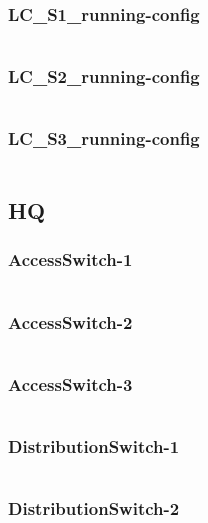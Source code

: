 \subsubsection{LC\_S1\_running-config} \label{configwlc}
\inputminted[fontsize=\tiny,linenos,breaklines]{text}{./Config/Branch/LC-S1-running-config.txt}
\subsubsection{LC\_S2\_running-config} \label{configwlc}
\inputminted[fontsize=\tiny,linenos,breaklines]{text}{./Config/Branch/LC-S2-running-config.txt}
\subsubsection{LC\_S3\_running-config} \label{configwlc}
\inputminted[fontsize=\tiny,linenos,breaklines]{text}{./Config/Branch/LC-S3-running-config.txt}

\subsection{HQ} \label{confighq}
\subsubsection{AccessSwitch-1} \label{configwlc}
\inputminted[fontsize=\tiny,linenos,breaklines]{text}{./Config/HQ/AccessSwitch-1.txt}
\subsubsection{AccessSwitch-2} \label{configwlc}
\inputminted[fontsize=\tiny,linenos,breaklines]{text}{./Config/HQ/AccessSwitch-2.txt}
\subsubsection{AccessSwitch-3} \label{configwlc}
\inputminted[fontsize=\tiny,linenos,breaklines]{text}{./Config/HQ/AccessSwitch-3.txt}
\subsubsection{DistributionSwitch-1} \label{configwlc}
\inputminted[fontsize=\tiny,linenos,breaklines]{text}{./Config/HQ/DistributionSwitch-1.txt}
\subsubsection{DistributionSwitch-2} \label{configwlc}
\inputminted[fontsize=\tiny,linenos,breaklines]{text}{./Config/HQ/DistributionSwitch-2.txt}
